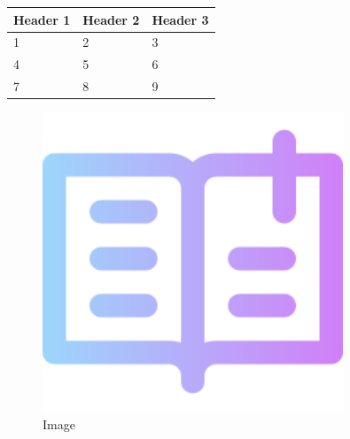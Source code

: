 \documentclass{article}
\begin{document}
\begin{tabular}{|l|l|l|}
\hline
Header 1 & Header 2 & Header 3 \\
\hline
1 & 2 & 3 \\
\hline
4 & 5 & 6 \\
\hline
7 & 8 & 9 \\
\hline
\end{tabular}
\begin{figure}[ht]
\centering
\includegraphics[width=0.8\textwidth]{image.png}
\caption{Image}
\label{fig:image}
\end{figure}
\end{document}
